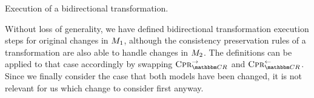 
\begin{algorithm}
    
    \caption[Execution of a bidirectional transformation]{Execution of a bidirectional transformation.}
    \label{algo:synchronization:execute_bidirectional_transformation}
\end{algorithm}



Without loss of generality, we have defined bidirectional transformation execution steps for original changes in $\metamodel{M}{1}$, although the consistency preservation rules of a transformation are also able to handle changes in $\metamodel{M}{2}$.
The definitions can be applied to that case accordingly by swapping $\consistencypreservationrule{\consistencyrelationset{CR}}^{\rightarrow}$ and $\consistencypreservationrule{\consistencyrelationset{CR}}^{\leftarrow}$.
Since we finally consider the case that both models have been changed, it is not relevant for us which change to consider first anyway.



